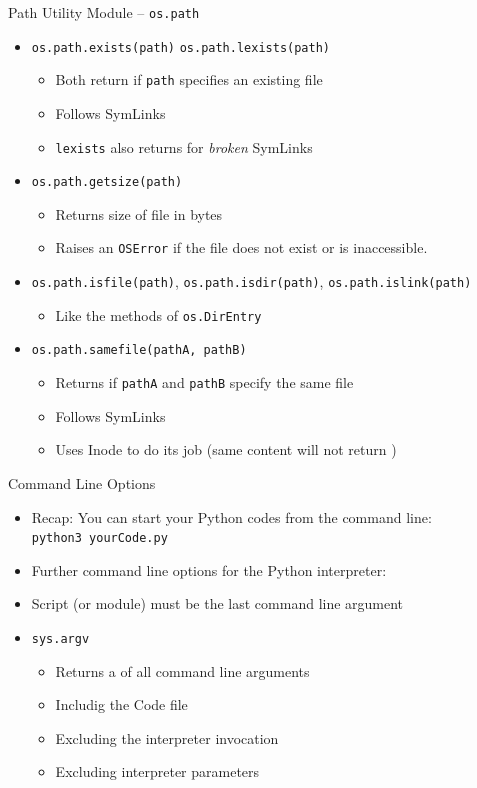 \begin{frame}{Path Utility Module -- \texttt{os.path}}
%
\begin{itemize}
\item \texttt{os.path.exists(path)} \texttt{os.path.lexists(path)}
	\begin{itemize}
	\item Both return  if \texttt{path} specifies an existing file
	\item Follows SymLinks
	\item \texttt{lexists} also returns  for \emph{broken} SymLinks
	\end{itemize}
\item \texttt{os.path.getsize(path)}
	\begin{itemize}
	\item Returns size of file in bytes
	\item Raises an \texttt{OSError} if the file does not exist or is inaccessible.
	\end{itemize}
\item \texttt{os.path.isfile(path)}, \texttt{os.path.isdir(path)}, \texttt{os.path.islink(path)}
	\begin{itemize}
	\item Like the methods of \texttt{os.DirEntry}
	\end{itemize}
\item \texttt{os.path.samefile(pathA, pathB)}
	\begin{itemize}
	\item Returns  if \texttt{pathA} and \texttt{pathB} specify the same file
	\item Follows SymLinks
	\item Uses Inode to do its job (\ie same content will not return )
	\end{itemize}
\end{itemize}
%
\end{frame}


\begin{frame}{Command Line Options}
%
\begin{itemize}
\item Recap: You can start your Python codes from the command line:\\
	\texttt{python3 yourCode.py}
\item Further command line options for the Python interpreter: 
\item Script (or module) must be the last command line argument
\item \texttt{sys.argv}
	\begin{itemize}
	\item Returns a  of all command line arguments
	\item Includig the Code file
	\item Excluding the interpreter invocation
	\item Excluding interpreter parameters
	\end{itemize}
\end{itemize}
%
\end{frame}

